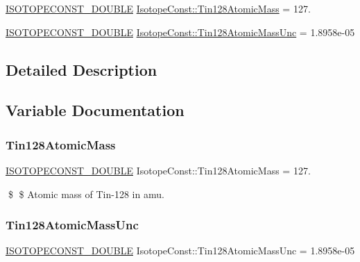 \begin{DoxyCompactItemize}
\item 
\mbox{\hyperlink{group___isotope_const-_macros_ga8f45a7272ce02c0b4c65c44636ed719a}{I\+S\+O\+T\+O\+P\+E\+C\+O\+N\+S\+T\+\_\+\+D\+O\+U\+B\+LE}} \mbox{\hyperlink{group___isotope_const-_tin-_sn128_ga08d82f06e4819ac90998c64b18437f6a}{Isotope\+Const\+::\+Tin128\+Atomic\+Mass}} = 127.
\item 
\mbox{\hyperlink{group___isotope_const-_macros_ga8f45a7272ce02c0b4c65c44636ed719a}{I\+S\+O\+T\+O\+P\+E\+C\+O\+N\+S\+T\+\_\+\+D\+O\+U\+B\+LE}} \mbox{\hyperlink{group___isotope_const-_tin-_sn128_ga43582a779852b79d253405aa899f6a18}{Isotope\+Const\+::\+Tin128\+Atomic\+Mass\+Unc}} = 1.\+8958e-\/05
\end{DoxyCompactItemize}


\subsection{Detailed Description}


\subsection{Variable Documentation}
\mbox{\label{group___isotope_const-_tin-_sn128_ga08d82f06e4819ac90998c64b18437f6a}} 
\subsubsection{\texorpdfstring{Tin128\+Atomic\+Mass}{Tin128AtomicMass}}
{\footnotesize\ttfamily \mbox{\hyperlink{group___isotope_const-_macros_ga8f45a7272ce02c0b4c65c44636ed719a}{I\+S\+O\+T\+O\+P\+E\+C\+O\+N\+S\+T\+\_\+\+D\+O\+U\+B\+LE}} Isotope\+Const\+::\+Tin128\+Atomic\+Mass = 127.}

\$ \$ Atomic mass of Tin-\/128 in amu. \mbox{\label{group___isotope_const-_tin-_sn128_ga43582a779852b79d253405aa899f6a18}} 
\subsubsection{\texorpdfstring{Tin128\+Atomic\+Mass\+Unc}{Tin128AtomicMassUnc}}
{\footnotesize\ttfamily \mbox{\hyperlink{group___isotope_const-_macros_ga8f45a7272ce02c0b4c65c44636ed719a}{I\+S\+O\+T\+O\+P\+E\+C\+O\+N\+S\+T\+\_\+\+D\+O\+U\+B\+LE}} Isotope\+Const\+::\+Tin128\+Atomic\+Mass\+Unc = 1.\+8958e-\/05}


